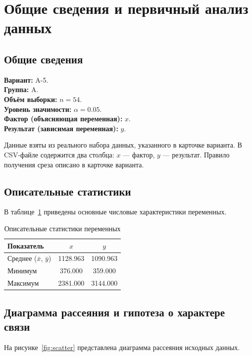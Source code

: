 \section{Общие сведения и первичный анализ данных}

\subsection{Общие сведения}

\textbf{Вариант:} A-5.\\
\textbf{Группа:} A.\\
\textbf{Объём выборки:} \(n = 54\).\\
\textbf{Уровень значимости:} \(\alpha = 0.05\).\\
\textbf{Фактор (объясняющая переменная):} \(x\).\\
\textbf{Результат (зависимая переменная):} \(y\).

Данные взяты из реального набора данных, указанного в карточке варианта. В CSV-файле содержится два столбца: \(x\) — фактор, \(y\) — результат. Правило получения среза описано в карточке варианта.

\subsection{Описательные статистики}

В таблице~\ref{tab:desc} приведены основные числовые характеристики переменных.

\begin{table}[H]
\centering
\caption{Описательные статистики переменных}
\label{tab:desc}
\begin{tabular}{lcc}
\toprule
Показатель & \(x\) & \(y\) \\
\midrule
Среднее (\(\bar{x}\), \(\bar{y}\)) & 1128.963 & 1090.963 \\
Минимум & 376.000 & 359.000 \\
Максимум & 2381.000 & 3144.000 \\
\bottomrule
\end{tabular}
\end{table}

\subsection{Диаграмма рассеяния и гипотеза о характере связи}

На рисунке~\ref{fig:scatter} представлена диаграмма рассеяния исходных данных.

